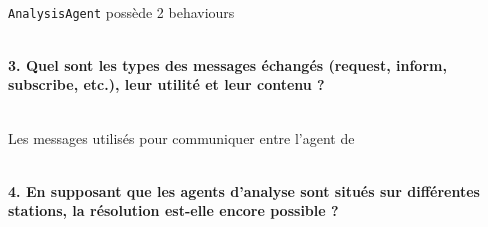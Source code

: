 \documentclass[11pt]{report}
\begin{document}
~\\
\verb|AnalysisAgent| possède 2 behaviours 

~\\
\textbf{3. Quel sont les types des messages échangés (request, inform, subscribe, etc.), leur
utilité et leur contenu ?}

~\\
Les messages utilisés pour communiquer entre l'agent de 

~\\
\textbf{4. En supposant que les agents d'analyse sont situés sur différentes stations, la résolution
est-elle encore possible ?}
\end{document}
